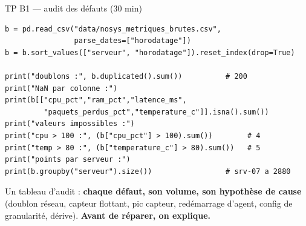 \begin{frame}[fragile]{TP B1 --- audit des défauts (30 min)}
\begin{codebox}
\begin{lstlisting}
b = pd.read_csv("data/nosys_metriques_brutes.csv",
                parse_dates=["horodatage"])
b = b.sort_values(["serveur", "horodatage"]).reset_index(drop=True)

print("doublons :", b.duplicated().sum())          # 200
print("NaN par colonne :")
print(b[["cpu_pct","ram_pct","latence_ms",
         "paquets_perdus_pct","temperature_c"]].isna().sum())
print("valeurs impossibles :")
print("cpu > 100 :", (b["cpu_pct"] > 100).sum())        # 4
print("temp > 80 :", (b["temperature_c"] > 80).sum())   # 5
print("points par serveur :")
print(b.groupby("serveur").size())                 # srv-07 a 2880
\end{lstlisting}
\end{codebox}
\begin{abox}[Livrable B1]
Un tableau d'audit : \textbf{chaque défaut, son volume, son hypothèse de cause}
(doublon réseau, capteur flottant, pic capteur, redémarrage d'agent,
config de granularité, dérive). \textbf{Avant de réparer, on explique.}
\end{abox}
\end{frame}

